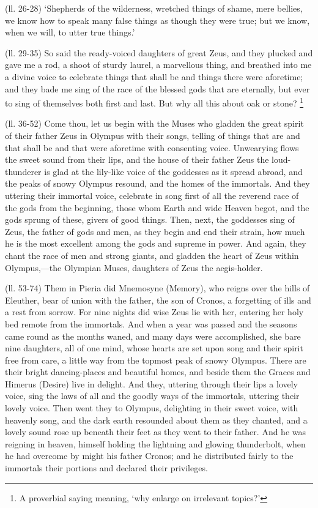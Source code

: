 (ll. 26-28) ‘Shepherds of the wilderness, wretched things of shame, mere
bellies, we know how to speak many false things as though they were true; but
we know, when we will, to utter true things.’

(ll. 29-35) So said the ready-voiced daughters of great Zeus, and they plucked
and gave me a rod, a shoot of sturdy laurel, a marvellous thing, and breathed
into me a divine voice to celebrate things that shall be and things there were
aforetime; and they bade me sing of the race of the blessed gods that are
eternally, but ever to sing of themselves both first and last. But why all this
about oak or stone? \footnote{A proverbial saying
meaning, ‘why enlarge on irrelevant topics?’}

(ll. 36-52) Come thou, let us begin with the Muses who gladden the great spirit
of their father Zeus in Olympus with their songs, telling of things that are
and that shall be and that were aforetime with consenting voice. Unwearying
flows the sweet sound from their lips, and the house of their father Zeus the
loud-thunderer is glad at the lily-like voice of the goddesses as it spread
abroad, and the peaks of snowy Olympus resound, and the homes of the immortals.
And they uttering their immortal voice, celebrate in song first of all the
reverend race of the gods from the beginning, those whom Earth and wide Heaven
begot, and the gods sprung of these, givers of good things. Then, next, the
goddesses sing of Zeus, the father of gods and men, as they begin and end their
strain, how much he is the most excellent among the gods and supreme in power.
And again, they chant the race of men and strong giants, and gladden the heart
of Zeus within Olympus,—the Olympian Muses, daughters of Zeus the
aegis-holder.

(ll. 53-74) Them in Pieria did Mnemosyne (Memory), who reigns over the hills of
Eleuther, bear of union with the father, the son of Cronos, a forgetting of
ills and a rest from sorrow. For nine nights did wise Zeus lie with her,
entering her holy bed remote from the immortals. And when a year was passed and
the seasons came round as the months waned, and many days were accomplished,
she bare nine daughters, all of one mind, whose hearts are set upon song and
their spirit free from care, a little way from the topmost peak of snowy
Olympus. There are their bright dancing-places and beautiful homes, and beside
them the Graces and Himerus (Desire) live in delight. And they, uttering
through their lips a lovely voice, sing the laws of all and the goodly ways of
the immortals, uttering their lovely voice. Then went they to Olympus,
delighting in their sweet voice, with heavenly song, and the dark earth
resounded about them as they chanted, and a lovely sound rose up beneath their
feet as they went to their father. And he was reigning in heaven, himself
holding the lightning and glowing thunderbolt, when he had overcome by might
his father Cronos; and he distributed fairly to the immortals their portions
and declared their privileges.

